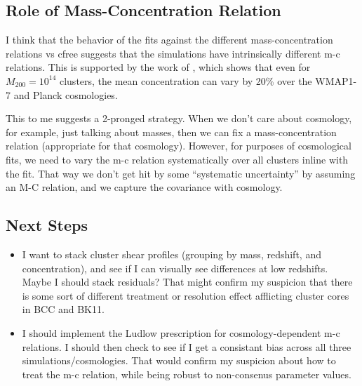 \documentclass[11pt]{article}
\begin{document}
\subsection{Role of Mass-Concentration Relation}

I think that the behavior of the fits against the different mass-concentration relations vs cfree suggests that the simulations have intrinsically different m-c relations. This is supported by the work of \citet{ludlow_mc}, which shows that even for $M_{200} = 10^{14}$ clusters, the mean concentration can vary by 20\% over the WMAP1-7 and Planck cosmologies. 

This to me suggests a 2-pronged strategy. When we don't care about cosmology, for example, just talking about masses, then we can fix a mass-concentration relation (appropriate for that cosmology). However, for purposes of cosmological fits, we need to vary the m-c relation systematically over all clusters inline with the fit. That way we don't get hit by some ``systematic uncertainty'' by assuming an M-C relation, and we capture the covariance with cosmology.


\subsection{Next Steps}

\begin{itemize}
\item I want to stack cluster shear profiles (grouping by mass, redshift, and concentration), and see if I can visually see differences at low redshifts. Maybe I should stack residuals? That might confirm my suspicion that there is some sort of different treatment or resolution effect afflicting cluster cores in BCC and BK11.
\item I should implement the Ludlow prescription for cosmology-dependent m-c relations. I should then check to see if I get a consistant bias across all three simulations/cosmologies. That would confirm my suspicion about how to treat the m-c relation, while being robust to non-consenus parameter values.
\end{itemize}


\clearpage \newpage
\end{document}
